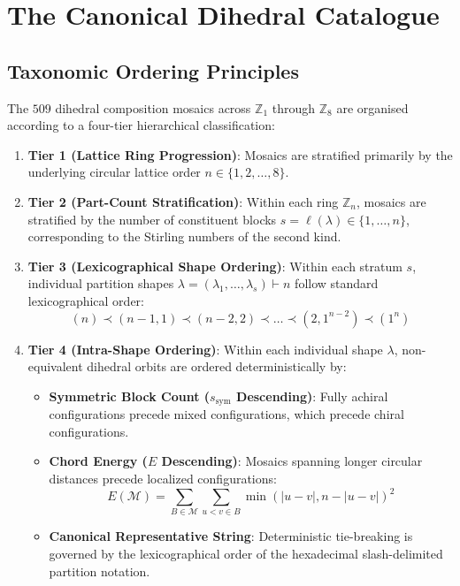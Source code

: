 \chapter{The Canonical Dihedral Catalogue}
\label{chap:canonical-taxonomy}

\section{Taxonomic Ordering Principles}

The $509$ dihedral composition mosaics across $\mathbb{Z}_1$ through $\mathbb{Z}_8$ are organised according to a four-tier hierarchical classification:

\begin{enumerate}
    \item \textbf{Tier 1 (Lattice Ring Progression)}: Mosaics are stratified primarily by the underlying circular lattice order $n \in \{1, 2, \dots, 8\}$.
    
    \item \textbf{Tier 2 (Part-Count Stratification)}: Within each ring $\mathbb{Z}_n$, mosaics are stratified by the number of constituent blocks $s = \ell(\lambda) \in \{1, \dots, n\}$, corresponding to the Stirling numbers of the second kind.
    
    \item \textbf{Tier 3 (Lexicographical Shape Ordering)}: Within each stratum $s$, individual partition shapes $\lambda = (\lambda_1, \dots, \lambda_s) \vdash n$ follow standard lexicographical order:
    \begin{equation}
    (n) \prec (n-1, 1) \prec (n-2, 2) \prec \dots \prec (2, 1^{n-2}) \prec (1^n)
    \end{equation}
    
    \item \textbf{Tier 4 (Intra-Shape Ordering)}: Within each individual shape $\lambda$, non-equivalent dihedral orbits are ordered deterministically by:
    \begin{itemize}
        \item \textbf{Symmetric Block Count ($s_{\text{sym}}$ Descending)}: Fully achiral configurations precede mixed configurations, which precede chiral configurations.
        \item \textbf{Chord Energy ($E$ Descending)}: Mosaics spanning longer circular distances precede localized configurations:
        \begin{equation}
        E(\mathcal{M}) = \sum_{B \in \mathcal{M}} \sum_{u < v \in B} \min(|u - v|, n - |u - v|)^2
        \end{equation}
        \item \textbf{Canonical Representative String}: Deterministic tie-breaking is governed by the lexicographical order of the hexadecimal slash-delimited partition notation.
    \end{itemize}
\end{enumerate}

